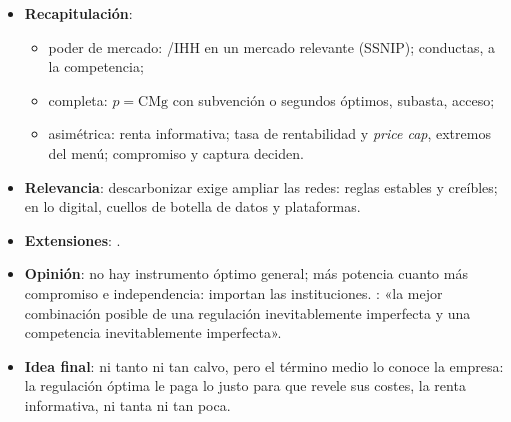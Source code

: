\documentclass{article}
\begin{document}
\begin{columnas}
\begin{itemize}
\item \textbf{Recapitulación}:
  \begin{itemize}
  \item poder de mercado: /IHH en un mercado relevante (SSNIP); conductas, a la competencia;
  \item completa: $p=\mathrm{CMg}$ con subvención o segundos óptimos, subasta, acceso;
  \item asimétrica: renta informativa; tasa de rentabilidad y \emph{price cap}, extremos del menú; compromiso y captura deciden.
  \end{itemize}
\item \textbf{Relevancia}: descarbonizar exige ampliar las redes: reglas estables y creíbles; en lo digital, cuellos de botella de datos y plataformas.
\item \textbf{Extensiones}:        .
\item \textbf{Opinión}: no hay instrumento óptimo general; más potencia cuanto más compromiso e independencia: importan las instituciones. : «la mejor combinación posible de una regulación inevitablemente imperfecta y una competencia inevitablemente imperfecta».
\item \textbf{Idea final}: ni tanto ni tan calvo, pero el término medio lo conoce la empresa: la regulación óptima le paga lo justo para que revele sus costes, la renta informativa, ni tanta ni tan poca.
\end{itemize}


\end{columnas}
\end{document}
